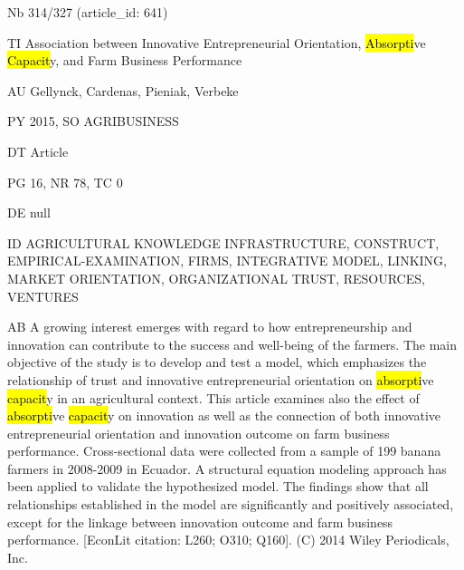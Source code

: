 \documentclass[a4paper]{article}
\begin{document}
\vspace*{-2cm}
Nb \tabto{0cm}314/327 (article\_id: 641)\par
TI \tabto{0cm}Association between Innovative Entrepreneurial Orientation, \hl{Absorpti}ve \hl{Capacit}y, and Farm Business Performance\par
AU \tabto{0cm}Gellynck, Cardenas, Pieniak, Verbeke\par
PY \tabto{0cm}2015, SO AGRIBUSINESS\par
DT \tabto{0cm}Article\par
PG \tabto{0cm}16, NR 78, TC 0\par
DE \tabto{0cm}null\par
ID \tabto{0cm}AGRICULTURAL KNOWLEDGE INFRASTRUCTURE, CONSTRUCT, EMPIRICAL-EXAMINATION, FIRMS, INTEGRATIVE MODEL, LINKING, MARKET ORIENTATION, ORGANIZATIONAL TRUST, RESOURCES, VENTURES\par
AB \tabto{0cm}A growing interest emerges with regard to how entrepreneurship and innovation can contribute to the success and well-being of the farmers. The main objective of the study is to develop and test a model, which emphasizes the relationship of trust and innovative entrepreneurial orientation on \hl{absorpti}ve \hl{capacit}y in an agricultural context. This article examines also the effect of \hl{absorpti}ve \hl{capacit}y on innovation as well as the connection of both innovative entrepreneurial orientation and innovation outcome on farm business performance. Cross-sectional data were collected from a sample of 199 banana farmers in 2008-2009 in Ecuador. A structural equation modeling approach has been applied to validate the hypothesized model. The findings show that all relationships established in the model are significantly and positively associated, except for the linkage between innovation outcome and farm business performance. [EconLit citation: L260; O310; Q160]. (C) 2014 Wiley Periodicals, Inc.\par
\clearpage
\end{document}
